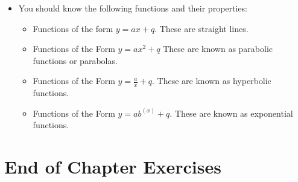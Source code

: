 \begin{itemize}[noitemsep]
\item  You should know the following functions and their properties:
    \begin{itemize}[noitemsep]
    \item Functions of the form $y=ax+q$. These are straight lines.
    \item Functions of the Form $y=a{x}^{2}+q$ These are known as parabolic functions or parabolas.
    \item Functions of the Form $y=\frac{a}{x}+q$. These are known as hyperbolic functions.
    \item Functions of the Form $y=a{b}^{(x)}+q$. These are known as exponential functions.
    \end{itemize}
\end{itemize}

\section{End of Chapter Exercises}
\nopagebreak
